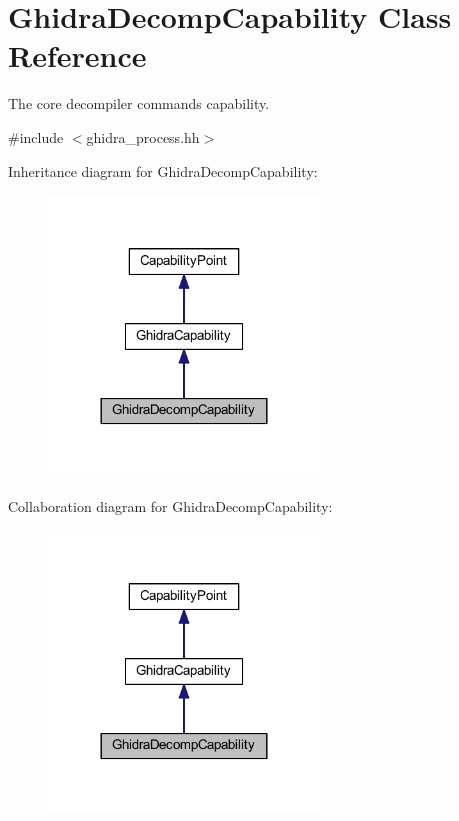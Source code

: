 \hypertarget{class_ghidra_decomp_capability}{}\section{Ghidra\+Decomp\+Capability Class Reference}
\label{class_ghidra_decomp_capability}


The core decompiler commands capability.  




{\ttfamily \#include $<$ghidra\+\_\+process.\+hh$>$}



Inheritance diagram for Ghidra\+Decomp\+Capability\+:
\nopagebreak
\begin{figure}[H]
\begin{center}
\leavevmode
\includegraphics[width=204pt]{class_ghidra_decomp_capability__inherit__graph}
\end{center}
\end{figure}


Collaboration diagram for Ghidra\+Decomp\+Capability\+:
\nopagebreak
\begin{figure}[H]
\begin{center}
\leavevmode
\includegraphics[width=204pt]{class_ghidra_decomp_capability__coll__graph}
\end{center}
\end{figure}
